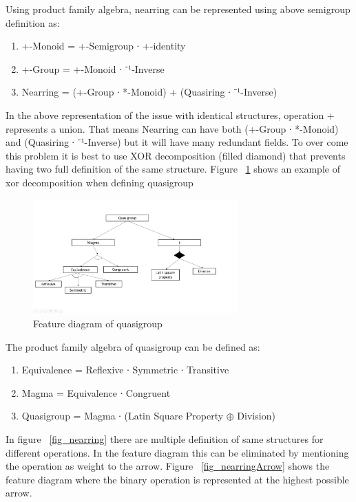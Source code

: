 Using product family algebra, nearring can be represented using above semigroup definition as:
\begin{enumerate}
\item  +-Monoid = +-Semigroup ∙ +-identity
\item  +-Group = +-Monoid ∙ ⁻¹-Inverse
\item  Nearring = (+-Group ∙ *-Monoid) + (Quasiring ∙ ⁻¹-Inverse)
\end{enumerate}

In the above representation of the issue with identical structures, operation +
represents a union. That means Nearring can have both (+-Group ∙ *-Monoid) and
(Quasiring ∙ ⁻¹-Inverse) but it will have many redundant fields. To over come
this problem it is best to use XOR decomposition (filled diamond) that prevents
having two full definition of the same structure. Figure ~\ref{fig_quasigroup}
shows an example of xor decomposition when defining quasigroup
 \begin{figure}[ht]
	\centering
	\includegraphics[width=0.7\textwidth]{figures/Sample/quasigroupPFA.jpg}
	\caption{Feature diagram of quasigroup}
	\label{fig_quasigroup}

\end{figure}
The product family algebra of quasigroup can be defined as:
\begin{enumerate}
\item Equivalence = Reflexive ∙ Symmetric ∙ Transitive 
\item Magma = Equivalence ∙ Congruent
\item Quasigroup = Magma ∙ (Latin Square Property \(\oplus\) Division)
\end{enumerate}
In figure ~\ref{fig_nearring} there are multiple definition of same structures
for different operations. In the feature diagram this can be eliminated by
mentioning the operation as weight to the arrow. Figure ~\ref{fig_nearringArrow}
shows the feature diagram where the binary operation is represented at the
highest possible arrow. 
